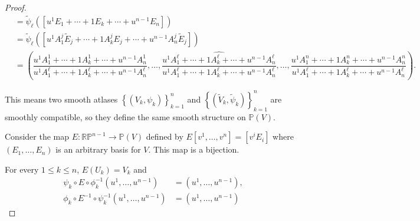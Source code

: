 \begin{proof}
\begin{align*}
         & = \widetilde{\psi}_{\ell}([u^{1}E_{1} + \cdots + 1E_{k} + \cdots + u^{n-1}E_{n}])                                                                                                                                                                                                                                                                                                                                                                                                                                  \\
         & = \widetilde{\psi}_{\ell}([u^{1}A_{1}^{j}\widetilde{E}_{j} + \cdots + 1 A_{k}^{j}E_{j} + \cdots + u^{n-1} A_{n}^{j}\widetilde{E}_{j}])                                                                                                                                                                                                                                                                                                                                                                             \\
         & = \left( \dfrac{u^{1}A_{1}^{1} + \cdots + 1A_{k}^{1} + \cdots + u^{n-1}A_{n}^{1}}{u^{1}A_{1}^{\ell} + \cdots + 1A_{k}^{\ell} + \cdots + u^{n-1}A_{n}^{\ell}}, \ldots, \widehat{\dfrac{u^{1}A_{1}^{\ell} + \cdots + 1A_{k}^{\ell} + \cdots + u^{n-1}A_{n}^{\ell}}{u^{1}A_{1}^{\ell} + \cdots + 1A_{k}^{\ell} + \cdots + u^{n-1}A_{n}^{\ell}}}, \ldots, \dfrac{u^{1}A_{1}^{n} + \cdots + 1A_{k}^{n} + \cdots + u^{n-1}A_{n}^{n}}{u^{1}A_{1}^{\ell} + \cdots + 1A_{k}^{\ell} + \cdots + u^{n-1}A_{n}^{\ell}} \right).
    \end{align*}
    \endgroup

    This means two smooth atlases \( {\left\{ (V_{k}, \psi_{k}) \right\}}_{k=1}^{n} \) and \( {\left\{ (\widetilde{V}_{k}, \widetilde{\psi}_{k}) \right\}}_{k=1}^{n} \) are smoothly compatible, so they define the same smooth structure on \( \mathbb{P}(V) \).

    Consider the map \( E: \mathbb{RP}^{n-1} \to \mathbb{P}(V) \) defined by \( E[v^{1}, \ldots, v^{n}] = [v^{i}E_{i}] \) where \( (E_{1}, \ldots, E_{n}) \) is an arbitrary basis for \( V \). This map is a bijection.

    For every \( 1 \le k \le n \), \( E(U_{k}) = V_{k} \) and
    \begingroup
    \allowdisplaybreaks%
    \begin{align*}
        \psi_{k} \circ E \circ \phi_{k}^{-1}(u^{1}, \ldots, u^{n-1})      & = (u^{1}, \ldots, u^{n-1}), \\
        \phi_{k} \circ E^{-1} \circ \psi_{k}^{-1}(u^{1}, \ldots, u^{n-1}) & = (u^{1}, \ldots, u^{n-1})
    \end{align*}
    \endgroup


\end{proof}
